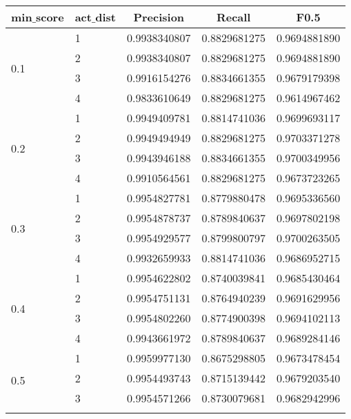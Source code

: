 \begin{longtable}{l|l|l|l|l}
\multicolumn{1}{c|}{\bfseries min$\_$score} & \multicolumn{1}{|c|}{\bfseries act$\_$dist} & \multicolumn{1}{|c|}{\bfseries Precision} & \multicolumn{1}{|c|}{\bfseries Recall} & \multicolumn{1}{|c}{\bfseries F0.5}\\ \hline
\endhead
 \hline


\multirow{4}{*}{0.1} & 1 & 0.9938340807 & 0.8829681275 & 0.9694881890 \\ \hhline{~----}
					 & 2 & 0.9938340807 & 0.8829681275 & 0.9694881890 \\ \hhline{~----}
					 & 3 & 0.9916154276 & 0.8834661355 & 0.9679179398 \\ \hhline{~----}
					 & 4 & 0.9833610649 & 0.8829681275 & 0.9614967462 \\ \hline
 \hline
\multirow{4}{*}{0.2} & 1 & 0.9949409781 & 0.8814741036 & 0.9699693117 \\ \hhline{~----}
					 & 2 & 0.9949494949 & 0.8829681275 & 0.9703371278 \\ \hhline{~----}
					 & 3 & 0.9943946188 & 0.8834661355 & 0.9700349956 \\ \hhline{~----}
					 & 4 & 0.9910564561 & 0.8829681275 & 0.9673723265 \\ \hline
 \hline
\multirow{4}{*}{0.3} & 1 & 0.9954827781 & 0.8779880478 & 0.9695336560 \\ \hhline{~----}
					 & 2 & 0.9954878737 & 0.8789840637 & 0.9697802198 \\ \hhline{~----}
					 & 3 & 0.9954929577 & 0.8799800797 & 0.9700263505 \\ \hhline{~----}
					 & 4 & 0.9932659933 & 0.8814741036 & 0.9686952715 \\ \hline
 \hline
\multirow{4}{*}{0.4} & 1 & 0.9954622802 & 0.8740039841 & 0.9685430464 \\ \hhline{~----}
					 & 2 & 0.9954751131 & 0.8764940239 & 0.9691629956 \\ \hhline{~----}
					 & 3 & 0.9954802260 & 0.8774900398 & 0.9694102113 \\ \hhline{~----}
					 & 4 & 0.9943661972 & 0.8789840637 & 0.9689284146 \\ \hline
 \hline
\multirow{4}{*}{0.5} & 1 & 0.9959977130 & 0.8675298805 & 0.9673478454 \\ \hhline{~----}
					 & 2 & 0.9954493743 & 0.8715139442 & 0.9679203540 \\ \hhline{~----}
					 & 3 & 0.9954571266 & 0.8730079681 & 0.9682942996 \\ \hhline{~----}

\end{longtable}
